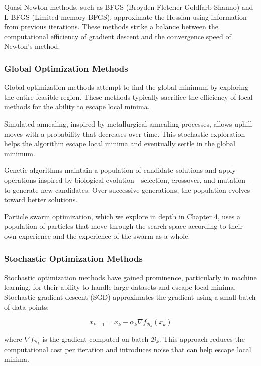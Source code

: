 Quasi-Newton methods, such as BFGS (Broyden-Fletcher-Goldfarb-Shanno) and L-BFGS (Limited-memory BFGS), approximate the Hessian using information from previous iterations. These methods strike a balance between the computational efficiency of gradient descent and the convergence speed of Newton's method.

\subsubsection{Global Optimization Methods}

Global optimization methods attempt to find the global minimum by exploring the entire feasible region. These methods typically sacrifice the efficiency of local methods for the ability to escape local minima.

Simulated annealing, inspired by metallurgical annealing processes, allows uphill moves with a probability that decreases over time. This stochastic exploration helps the algorithm escape local minima and eventually settle in the global minimum.

Genetic algorithms maintain a population of candidate solutions and apply operations inspired by biological evolution—selection, crossover, and mutation—to generate new candidates. Over successive generations, the population evolves toward better solutions.

Particle swarm optimization, which we explore in depth in Chapter 4, uses a population of particles that move through the search space according to their own experience and the experience of the swarm as a whole.

\subsubsection{Stochastic Optimization Methods}

Stochastic optimization methods have gained prominence, particularly in machine learning, for their ability to handle large datasets and escape local minima. Stochastic gradient descent (SGD) approximates the gradient using a small batch of data points:

\begin{equation}
x_{k+1} = x_k - \alpha_k \nabla f_{\mathcal{B}_k}(x_k)
\end{equation}

where $\nabla f_{\mathcal{B}_k}$ is the gradient computed on batch $\mathcal{B}_k$. This approach reduces the computational cost per iteration and introduces noise that can help escape local minima.

